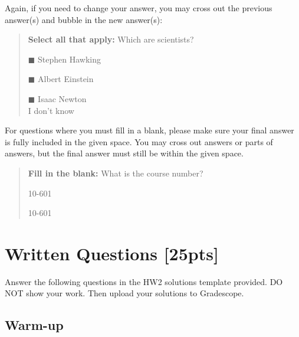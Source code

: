 \documentclass[11pt]{article}
\numberwithin{equation}{section} %
\numberwithin{figure}{section} %
\numberwithin{table}{section} %
\begin{document}
Again, if you need to change your answer, you may cross out the previous answer(s) and bubble in the new answer(s):

\begin{quote}
\textbf{Select all that apply:} Which are scientists?
    \begin{list}{}
    \item $\blacksquare$ Stephen Hawking 
    \item $\blacksquare$ Albert Einstein
    \item $\blacksquare$ Isaac Newton\\
    \xcancel{$\blacksquare$} I don't know
\end{list}
\end{quote}

For questions where you must fill in a blank, please make sure your final answer is fully included in the given space. You may cross out answers or parts of answers, but the final answer must still be within the given space.

\begin{quote}
\textbf{Fill in the blank:} What is the course number?

\begin{tcolorbox}[fit,height=1cm, width=4cm, blank, borderline={1pt}{-2pt},nobeforeafter]
    \begin{center}\huge10-601\end{center}
    \end{tcolorbox}\hspace{2cm}
    \begin{tcolorbox}[fit,height=1cm, width=4cm, blank, borderline={1pt}{-2pt},nobeforeafter]
    \begin{center}\huge10-601\end{center}
    \end{tcolorbox}
\end{quote}
\clearpage

\section{Written Questions [25pts]}
\label{sec:written}

Answer the following questions in the HW2 solutions template provided. DO NOT show your work. Then upload your solutions to Gradescope.

\subsection{Warm-up}
\label{sec:warmup}
\end{document}
